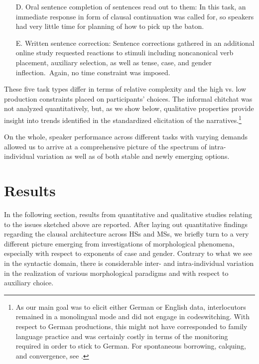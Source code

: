 \documentclass[output=paper]{langscibook}
\begin{document}
\begin{itemize}
\item[D.] Oral sentence completion of sentences read out to them: In this task, an immediate response in form of clausal continuation was called for, so speakers had very little time for planning of how to pick up the baton.
\item[E.]\sloppy Written sentence correction: Sentence corrections gathered in an additional online study requested reactions to stimuli including noncanonical verb placement, auxiliary selection, as well as tense, case, and gender inflection.~Again, no time constraint was imposed. 
\end{itemize}

These five task types differ in terms of relative complexity and the high vs. low production constraints placed on participants’ choices. The informal chitchat was not analyzed quantitatively, but, as we show below, qualitative properties provide insight into trends identified in the standardized elicitation of the narratives.\footnote{As our main goal was to elicit either German or English data, interlocutors remained in a monolingual mode and did not engage in codeswitching. With respect to German productions, this might not have corresponded to family language practice and was certainly costly in terms of the monitoring required in order to stick to German. For spontaneous borrowing, calquing, and convergence, see .}

On the whole, speaker performance across different tasks with varying demands allowed us to arrive at a comprehensive picture of the spectrum of intra-individual variation as well as of both stable and newly emerging options.

\section{Results}\label{sec:tsehaye:5}

In the following section, results from quantitative and qualitative studies relating to the issues sketched above are reported. After laying out quantitative findings regarding the clausal architecture across HSs and MSs, we briefly turn to a very different picture emerging from investigations of morphological phenomena, especially with respect to exponents of case and gender. Contrary to what we see in the syntactic domain, there is considerable inter- and intra-individual variation in the realization of various morphological paradigms and with respect to auxiliary choice.
\end{document}
